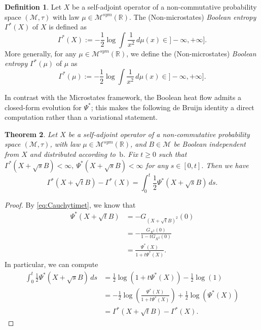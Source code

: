 \documentclass[10pt, reqno]{amsart}
\numberwithin{equation}{section}
\theoremstyle{definition}
\newtheorem{definition}{Definition}[section]
\theoremstyle{plain}
\newtheorem{theorem}[definition]{Theorem}
\theoremstyle{remark}
\newcommand{\R}{\mathbb{R}}
\newcommand{\1}{\mathbbm{1}}
\begin{document}
\begin{definition}
Let $X$ be a self-adjoint operator of a non-commutative probability space $(\mathcal{M},\tau)$ with law $\mu\in\mathcal{M}^{sym}(\R)$. The (Non-microstates) \textit{Boolean entropy} $\Gamma^*(X)$ of $X$ is defined as
\begin{equation}\label{Gamma*}
		\Gamma^*(X):=-\frac{1}{2}\log \int \frac{1}{x^2} \,d\mu(x)\in ]-\infty,+\infty].
	\end{equation}
    More generally, for any $\mu \in\mathcal{M}^{sym}(\R)$, we define the (Non-microstates) \textit{Boolean entropy} $\Gamma^*(\mu)$ of $\mu$ as
\begin{equation*}
		\Gamma^*(\mu):=-\frac{1}{2}\log \int \frac{1}{x^2}\,d\mu(x)\in ]-\infty,+\infty].
	\end{equation*}
\end{definition}
In contrast with the Microstates framework, the Boolean heat flow admits a
closed-form evolution for $\Psi^*$; this makes the following de Bruijn identity a
direct computation rather than a variational statement.
	\begin{theorem}\label{entfisher*}
Let $X$ be a self-adjoint operator of a non-commutative probability space $(\mathcal{M},\tau)$, with law $\mu\in\mathcal{M}^{sym}(\R)$,  and $B\in \mathcal{M}$ be Boolean independent from $X$ and distributed according to~$\mathrm{b}$. Fix $t\geq 0$ such that $\Gamma^*(X+\sqrt{s}B)<\infty,\ \Psi^*(X+\sqrt{s}B)<\infty$ for any $s\in[0,t].$ Then we have
		\begin{equation}\label{debruijn*}
		    \Gamma^*(X+\sqrt{t}B) - \Gamma^*(X) = \int_0^t \frac{1}{2}\Psi^*(X + \sqrt{s}B )\,ds.
	    \end{equation}
	\end{theorem}
    \begin{proof}
        By \eqref{eq:Cauchytimet}, we know that
        \begin{align*}
            \Psi^*(X+\sqrt{t}B)&=-G_{(X+\sqrt{t}B)^2}(0)\\
            &=-\frac{G_{X^2}(0)}{1-tG_{X^2}(0)}\\
            &=\frac{\Psi^*(X)}{1+t\Psi^*(X)}.
        \end{align*}
        In particular, we can compute
        \begin{align*}
            \int_0^t\frac{1}{2}\Psi^*(X+\sqrt{s}B)\,ds &=\frac{1}{2}\log(1+t\Psi^*(X))-\frac{1}{2}\log(1)\\
            &=-\frac{1}{2}\log\left(\frac{\Psi^*(X)}{1+t\Psi^*(X)}\right)+\frac{1}{2}\log(\Psi^*(X))\\
            &=\Gamma^*(X+\sqrt{t}B) - \Gamma^*(X).
        \end{align*}
    \end{proof}
\end{document}
